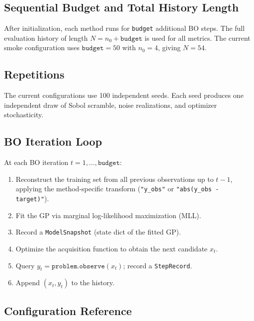 \documentclass[11pt]{article}
\begin{document}
\subsection{Sequential Budget and Total History Length}
 
After initialization, each method runs for \texttt{budget} additional BO steps.
The full evaluation history of length $N = n_0 + \texttt{budget}$ is used for all
metrics. The current smoke configuration uses $\texttt{budget} = 50$ with
$n_0 = 4$, giving $N = 54$.
 
\subsection{Repetitions}
 
The current configurations use 100 independent seeds.
Each seed produces one independent draw of Sobol scramble, noise realizations, and
optimizer stochasticity.
 
\subsection{BO Iteration Loop}
 
At each BO iteration $t = 1, \ldots, \texttt{budget}$:
\begin{enumerate}
  \item Reconstruct the training set from all previous observations up to $t-1$,
        applying the method-specific transform (\texttt{"y\_obs"} or
        \texttt{"abs(y\_obs - target)"}).
  \item Fit the GP via marginal log-likelihood maximization (MLL).
  \item Record a \texttt{ModelSnapshot} (state dict of the fitted GP).
  \item Optimize the acquisition function to obtain the next candidate $x_t$.
  \item Query $y_t = \texttt{problem.observe}(x_t)$; record a \texttt{StepRecord}.
  \item Append $(x_t, y_t)$ to the history.
\end{enumerate}
 
\subsection{Configuration Reference}
 
\end{document}
